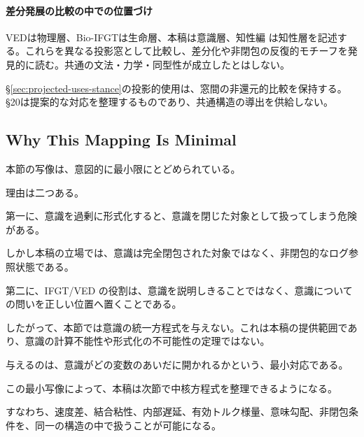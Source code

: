 \paragraph{差分発展の比較の中での位置づけ}
VEDは物理層、Bio-IFGTは生命層、本稿は意識層、知性編 \cite{Intelligence} は知性層を記述する。これらを異なる投影窓として比較し、差分化や非閉包の反復的モチーフを発見的に読む。共通の文法・力学・同型性が成立したとはしない。

§\ref{sec:projected-uses-stance}の投影的使用は、窓間の非還元的比較を保持する。§20は提案的な対応を整理するものであり、共通構造の導出を供給しない。

\subsection{Why This Mapping Is Minimal}

本節の写像は、意図的に最小限にとどめられている。

理由は二つある。

第一に、意識を過剰に形式化すると、意識を閉じた対象として扱ってしまう危険がある。

しかし本稿の立場では、意識は完全閉包された対象ではなく、非閉包的なログ参照状態である。

第二に、IFGT/VED の役割は、意識を説明しきることではなく、意識についての問いを正しい位置へ置くことである。

したがって、本節では意識の統一方程式を与えない。これは本稿の提供範囲であり、意識の計算不能性や形式化の不可能性の定理ではない。

与えるのは、意識がどの変数のあいだに開かれるかという、最小対応である。

この最小写像によって、本稿は次節で中核方程式を整理できるようになる。

すなわち、速度差、結合粘性、内部遅延、有効トルク様量、意味勾配、非閉包条件を、同一の構造の中で扱うことが可能になる。
